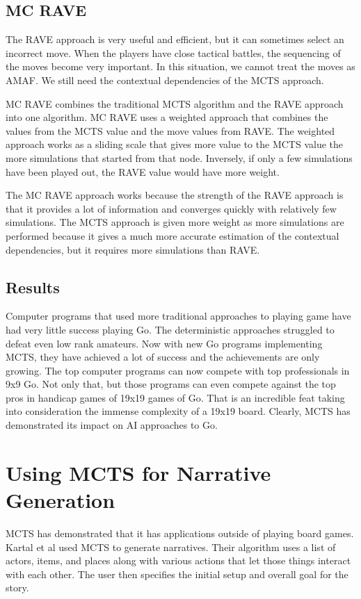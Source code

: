 \documentclass{sig-alternate}
\begin{document}
\subsection{MC RAVE}
The RAVE approach is very useful and efficient, but it can sometimes select an incorrect move\cite{RAVEinGo}. When the players have close tactical battles, the sequencing of the moves become very important. In this situation, we cannot treat the moves as AMAF. We still need the contextual dependencies of the MCTS approach.

MC RAVE combines the traditional MCTS algorithm and the RAVE approach into one algorithm. MC RAVE uses a weighted approach that combines the values from the MCTS value and the move values from RAVE. The weighted approach works as a sliding scale that gives more value to the MCTS value the more simulations that started from that node\cite{RAVEinGo}. Inversely, if only a few simulations have been played out, the RAVE value would have more weight.

The MC RAVE approach works because the strength of the RAVE approach is that it provides a lot of information and converges quickly with relatively few simulations. The MCTS approach is given more weight as more simulations are performed because it gives a much more accurate estimation of the contextual dependencies, but it requires more simulations than RAVE.

\subsection{Results}
Computer programs that used more traditional approaches to playing game have had very little success playing Go. The deterministic approaches struggled to defeat even low rank amateurs. Now with new Go programs implementing MCTS, they have achieved a lot of success and the achievements are only growing. The top computer programs can now compete with top professionals in 9x9 Go\cite{RAVEinGo}. Not only that, but those programs can even compete against the top pros in handicap games of 19x19 games of Go. That is an incredible feat taking into consideration the immense complexity of a 19x19 board. Clearly, MCTS has demonstrated its impact on AI approaches to Go.

\section{Using MCTS for Narrative Generation}
MCTS has demonstrated that it has applications outside of playing board games. Kartal et al\cite{Narrative} used MCTS to generate narratives. Their algorithm uses a list of actors, items, and places along with various actions that let those things interact with each other. The user then specifies the initial setup and overall goal for the story.
\end{document}
